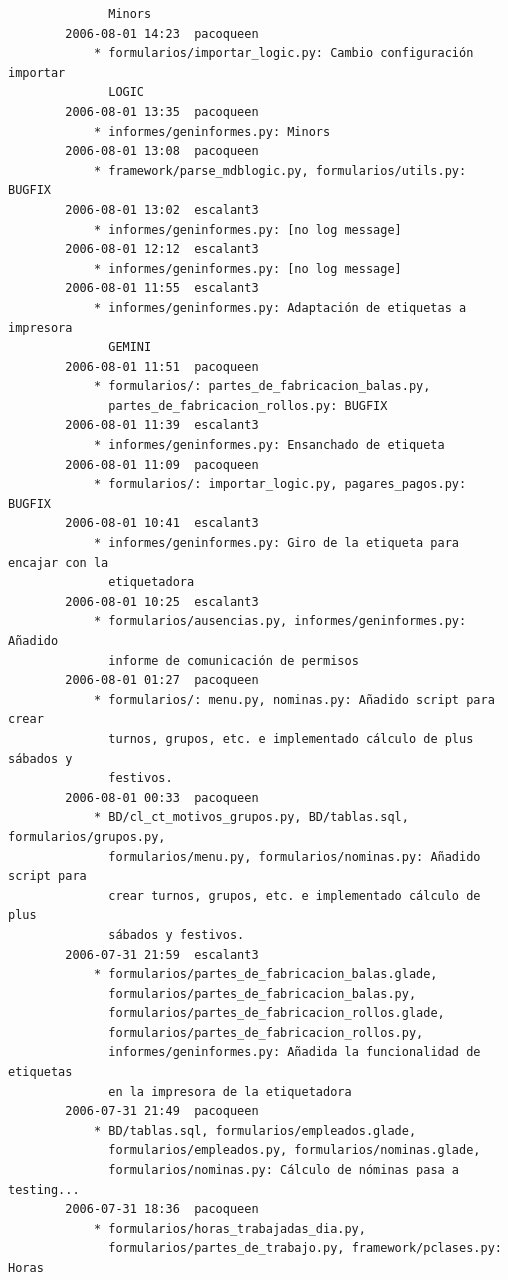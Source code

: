 \documentclass[a4paper]{article}
\begin{document}
\begin{verbatim}
              Minors
        2006-08-01 14:23  pacoqueen
            * formularios/importar_logic.py: Cambio configuración importar
              LOGIC
        2006-08-01 13:35  pacoqueen
            * informes/geninformes.py: Minors
        2006-08-01 13:08  pacoqueen
            * framework/parse_mdblogic.py, formularios/utils.py: BUGFIX
        2006-08-01 13:02  escalant3
            * informes/geninformes.py: [no log message]
        2006-08-01 12:12  escalant3
            * informes/geninformes.py: [no log message]
        2006-08-01 11:55  escalant3
            * informes/geninformes.py: Adaptación de etiquetas a impresora
              GEMINI
        2006-08-01 11:51  pacoqueen
            * formularios/: partes_de_fabricacion_balas.py,
              partes_de_fabricacion_rollos.py: BUGFIX
        2006-08-01 11:39  escalant3
            * informes/geninformes.py: Ensanchado de etiqueta
        2006-08-01 11:09  pacoqueen
            * formularios/: importar_logic.py, pagares_pagos.py: BUGFIX
        2006-08-01 10:41  escalant3
            * informes/geninformes.py: Giro de la etiqueta para encajar con la
              etiquetadora
        2006-08-01 10:25  escalant3
            * formularios/ausencias.py, informes/geninformes.py: Añadido
              informe de comunicación de permisos
        2006-08-01 01:27  pacoqueen
            * formularios/: menu.py, nominas.py: Añadido script para crear
              turnos, grupos, etc. e implementado cálculo de plus sábados y
              festivos.
        2006-08-01 00:33  pacoqueen
            * BD/cl_ct_motivos_grupos.py, BD/tablas.sql, formularios/grupos.py,
              formularios/menu.py, formularios/nominas.py: Añadido script para
              crear turnos, grupos, etc. e implementado cálculo de plus
              sábados y festivos.
        2006-07-31 21:59  escalant3
            * formularios/partes_de_fabricacion_balas.glade,
              formularios/partes_de_fabricacion_balas.py,
              formularios/partes_de_fabricacion_rollos.glade,
              formularios/partes_de_fabricacion_rollos.py,
              informes/geninformes.py: Añadida la funcionalidad de etiquetas
              en la impresora de la etiquetadora
        2006-07-31 21:49  pacoqueen
            * BD/tablas.sql, formularios/empleados.glade,
              formularios/empleados.py, formularios/nominas.glade,
              formularios/nominas.py: Cálculo de nóminas pasa a testing...
        2006-07-31 18:36  pacoqueen
            * formularios/horas_trabajadas_dia.py,
              formularios/partes_de_trabajo.py, framework/pclases.py: Horas

\end{verbatim}
\end{document}
